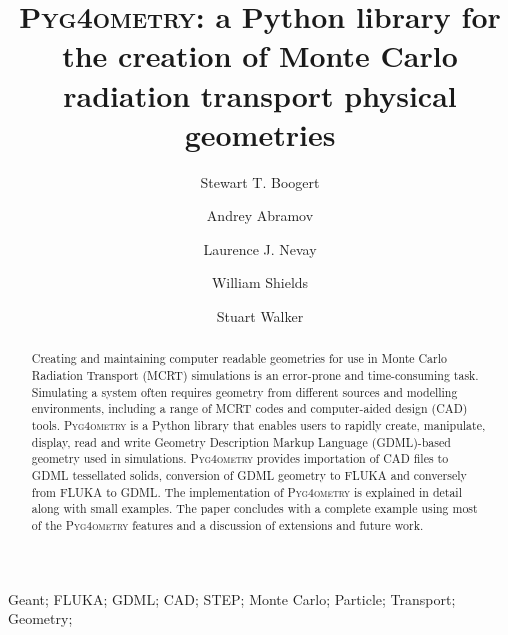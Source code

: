 \documentclass[final,5p,times,twocolumn]{elsarticle}
\newcommand{\PYGEOMETRY}{\textsc{Pyg4ometry}}
\begin{document}
\begin{frontmatter}



\title{\PYGEOMETRY{}: a Python library for the creation of Monte Carlo radiation transport physical geometries}


\author[a]{Stewart T. Boogert}
\author[a]{Andrey Abramov}
\author[a]{Laurence J. Nevay}
\author[a]{William Shields}
\author[a]{Stuart Walker}

\address[a]{John Adams Institute at Royal Holloway, Department of Physics, Royal Holloway, Egham, TW20 0EX, Surrey, UK}

\begin{abstract}
Creating and maintaining computer readable geometries for use in Monte Carlo Radiation Transport (MCRT) simulations is an
error-prone and time-consuming task. Simulating a system often requires geometry from different sources and modelling 
environments, including a range of MCRT codes and computer-aided design (CAD) tools. \PYGEOMETRY{} is a Python library 
that enables users to rapidly create, manipulate, display, read and write Geometry Description Markup Language (GDML)-based
geometry used in simulations. \PYGEOMETRY{} provides importation of CAD files to GDML tessellated solids, conversion of GDML geometry
to FLUKA and conversely from FLUKA to GDML. The implementation of \PYGEOMETRY{} is explained in detail along with small  
examples. The paper concludes with a complete example using most of the \PYGEOMETRY{} features and a discussion of 
extensions and future work.
\end{abstract}

\begin{keyword}
Geant; FLUKA; GDML; CAD; STEP; Monte Carlo; Particle; Transport; Geometry; 

\end{keyword}

\end{frontmatter}
\end{document}
